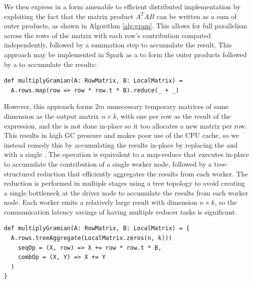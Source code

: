 We then express  in a form amenable to efficient distributed implementation
by exploiting the fact that the matrix product $A^TAB$ can be written as a sum of outer products,
as shown in Algorithm \ref{alg:gram}. This allows for full parallelism across the rows of the matrix with
each row's contribution computed independently, followed by a summation step to accumulate the result.
This approach may be implemented in Spark as a  to form the outer products followed by a 
to accumulate the results:
\begin{verbatim}
def multiplyGramian(A: RowMatrix, B: LocalMatrix) =
  A.rows.map(row => row * row.t * B).reduce(_ + _)
\end{verbatim}
However, this approach forms $2m$ unnecessary temporary matrices of same dimension as the output matrix $n\times k$,
with one per row as the result of the  expression, and the  is not done in-place so it
too allocates a new matrix per row.
This results in high GC pressure and makes poor use of the CPU cache, so
we instead remedy this by accumulating the results in-place by replacing the 
and  with a single .
The  operation is equivalent to a map-reduce that executes in-place to accumulate the contribution of a 
single worker node, followed by a
tree-structured reduction that efficiently aggregates the results from each worker.
The reduction is performed in multiple stages using a tree topology to avoid creating a single
bottleneck at the driver node to accumulate the results from each worker node.
Each worker emits a relatively large result with dimension $n\times k$, so the
communication latency savings of having multiple reducer tasks is significant.
\begin{verbatim}
def multiplyGramian(A: RowMatrix, B: LocalMatrix) = {
  A.rows.treeAggregate(LocalMatrix.zeros(n, k))(
    seqOp = (X, row) => X += row * row.t * B,
    combOp = (X, Y) => X += Y
  )
}
\end{verbatim}



